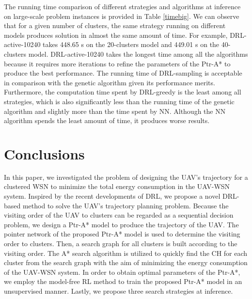 \documentclass[journal]{IEEEtran}
\begin{document}
The running time comparison of different strategies and algorithms at inference on large-scale problem instances is provided in Table \ref{timebig}. We can observe that for a given number of clusters, the same strategy running on different models produces solution in almost the same amount of time. For example, DRL-active-10240 takes 448.65 s on the 20-clusters model and 449.01 s on the 40-clusters model. DRL-active-10240 takes the longest time among all the algorithms because it requires more iterations to refine the parameters of the Ptr-A* to produce the best performance. The running time of DRL-sampling is acceptable in comparison with the genetic algorithm given its performance merits. Furthermore, the computation time spent by DRL-greedy is the least among all strategies, which is also significantly less than the running time of the genetic algorithm and slightly more than the time spent by NN. Although the NN algorithm spends the least amount of time, it produces worse results.







\section{Conclusions}\label{SecVII}





In this paper, we investigated the problem of designing the UAV's trajectory for a clustered WSN to minimize the total energy consumption in the UAV-WSN system.
Inspired by the recent developments of DRL, we propose a novel DRL-based method to solve the UAV's trajectory planning problem. Because the visiting order of the UAV to clusters can be regarded as a sequential decision problem, we design a Ptr-A* model to produce the trajectory of the UAV. The pointer network of the proposed Ptr-A* model is used to determine the visiting order to clusters. Then, a search graph for all clusters is built according to the visiting order. The A* search algorithm is utilized to quickly find the CH for each cluster from the search graph with the aim of minimizing the energy consumption of the UAV-WSN system. In order to obtain optimal parameters of the Ptr-A*, we employ the model-free RL method to train the proposed Ptr-A* model in an unsupervised manner. Lastly, we propose three search strategies at inference.
\end{document}
